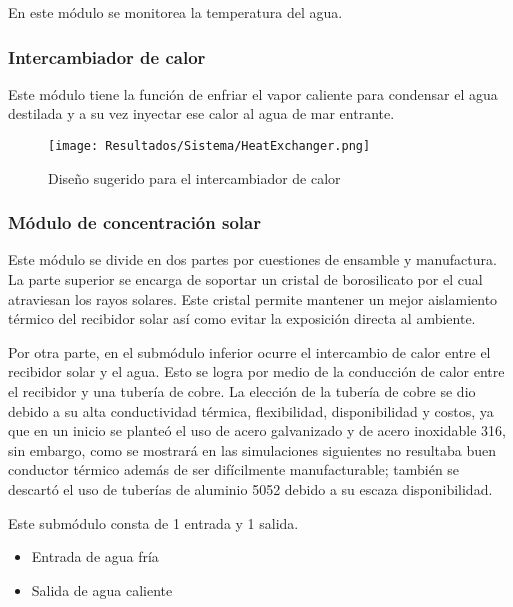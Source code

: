 				\begin{center}
					En este módulo se monitorea la temperatura del agua.
				\end{center}
			
			\subsubsection{Intercambiador de calor}
			
				Este módulo tiene la función de enfriar el vapor caliente para condensar el agua destilada y a su vez inyectar ese calor al agua de mar entrante.
				
				\begin{figure}[H]
					\centering
					\texttt{[image: Resultados/Sistema/HeatExchanger.png]}
					\caption{Diseño sugerido para el intercambiador de calor}
					\label{fig:HeatExchanger}
				\end{figure}
			
			\subsubsection{Módulo de concentración solar}
				
				Este módulo se divide en dos partes por cuestiones de ensamble y manufactura. La parte superior se encarga de soportar un cristal de borosilicato por el cual atraviesan los rayos solares. Este cristal permite mantener un mejor aislamiento térmico del recibidor solar así como evitar la exposición directa al ambiente.
				
				Por otra parte, en el submódulo inferior ocurre el intercambio de calor entre el recibidor solar y el agua. Esto se logra por medio de la conducción de calor entre el recibidor y una tubería de cobre. La elección de la tubería de cobre se dio debido a su alta conductividad térmica, flexibilidad, disponibilidad y costos, ya que en un inicio se planteó el uso de acero galvanizado y de acero inoxidable 316, sin embargo, como se mostrará en las simulaciones siguientes no resultaba buen conductor térmico además de ser difícilmente manufacturable; también se descartó el uso de tuberías de aluminio 5052 debido a su escaza disponibilidad.
				
				Este submódulo consta de 1 entrada y 1 salida.
				
				\begin{itemize}[columns=2]
					\item Entrada de agua fría
					\item Salida de agua caliente
				\end{itemize}
				
